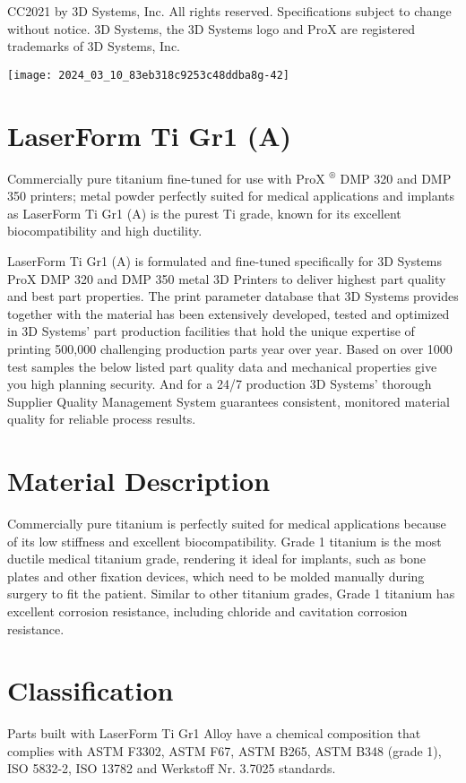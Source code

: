 \documentclass[10pt]{article}
\begin{document}
CC2021 by 3D Systems, Inc. All rights reserved. Specifications subject to change without notice. 3D Systems, the 3D Systems logo and ProX are registered trademarks of 3D Systems, Inc.

\begin{center}
\texttt{[image: 2024\_03\_10\_83eb318c9253c48ddba8g-42]}
\end{center}

\section*{LaserForm Ti Gr1 (A)}
Commercially pure titanium fine-tuned for use with ProX ${ }^{\circledR}$ DMP 320 and DMP 350 printers; metal powder perfectly suited for medical applications and implants as LaserForm Ti Gr1 (A) is the purest Ti grade, known for its excellent biocompatibility and high ductility.

LaserForm Ti Gr1 (A) is formulated and fine-tuned specifically for 3D Systems ProX DMP 320 and DMP 350 metal 3D Printers to deliver highest part quality and best part properties. The print parameter database that 3D Systems provides together with the material has been extensively developed, tested and optimized in 3D Systems' part production facilities that hold the unique expertise of printing 500,000 challenging production parts year over year. Based on over 1000 test samples the below listed part quality data and mechanical properties give you high planning security. And for a 24/7 production 3D Systems' thorough Supplier Quality Management System guarantees consistent, monitored material quality for reliable process results.

\section*{Material Description}
Commercially pure titanium is perfectly suited for medical applications because of its low stiffness and excellent biocompatibility. Grade 1 titanium is the most ductile medical titanium grade, rendering it ideal for implants, such as bone plates and other fixation devices, which need to be molded manually during surgery to fit the patient. Similar to other titanium grades, Grade 1 titanium has excellent corrosion resistance, including chloride and cavitation corrosion resistance.

\section*{Classification}
Parts built with LaserForm Ti Gr1 Alloy have a chemical composition that complies with ASTM F3302, ASTM F67, ASTM B265, ASTM B348 (grade 1), ISO 5832-2, ISO 13782 and Werkstoff Nr. 3.7025 standards.
\end{document}
